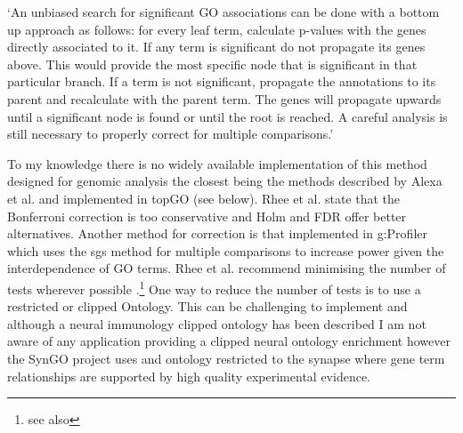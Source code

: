 `An unbiased search for significant GO associations can be done with a bottom up approach as follows: for every leaf term, calculate p-values with the genes directly associated to it. If any term is significant do not propagate its genes above. This would provide the most specific node that is significant in that particular branch. If a term is not significant, propagate the annotations to its parent and recalculate with the parent term. The genes will propagate upwards until a significant node is found or until the root is reached. A careful analysis is still necessary to properly correct for multiple comparisons.'\cite{rhee2008use}

 To my knowledge there is no widely available implementation of this method designed for genomic analysis the closest being the methods described by Alexa et al.\cite{alexa2006improved} and implemented in topGO\cite{alexa2009gene} (see below).  Rhee et al.\cite{rhee2008use} state that the Bonferroni correction is too conservative and Holm and FDR offer better alternatives. Another method for correction is that implemented in g:Profiler \cite{raudvere2019g} which uses the sgs method for multiple comparisons to increase power given the interdependence of GO terms. 
 Rhee et al. recommend minimising the number of tests wherever possible \cite{rhee2008use}.\footnote{see also }
One way to reduce the number of tests is to use a restricted or clipped Ontology. This can be challenging to implement and although a neural immunology clipped ontology has been described \cite{geifman2010neural} I am not aware of any application providing a clipped neural ontology enrichment however the SynGO project\cite{koopmans2019syngo} uses and ontology restricted to the synapse where gene term relationships are supported by  high quality experimental evidence.



